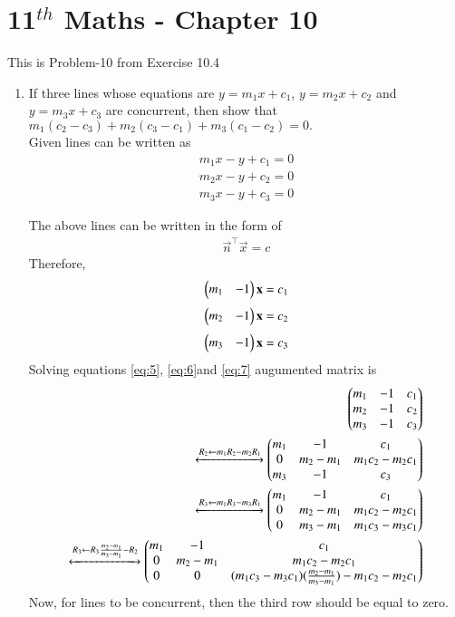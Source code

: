 \documentclass[12pt]{article}
\begin{document}
\section*{11$^{th}$ Maths - Chapter 10}
This is Problem-10 from Exercise 10.4
\begin{enumerate}
    \item If three lines whose equations are $y=m_1x+c_1$, $y=m_2x+c_2$ and $y=m_3x+c_3$ are concurrent, then show that $m_1(c_2-c_3)+m_2(c_3-c_1)+m_3(c_1-c_2) = 0.$\\
    \solution 
    Given lines can be written as \begin{align}
       m_1x-y+c_1=0
    \end{align}
    \begin{align}
        m_2x-y+c_2=0
    \end{align}
    \begin{align}
        m_3x-y+c_3=0
        \label{eq:3}
    \end{align}
    
    
   The above lines can be written in the form of \begin{align}
        \Vec{n}^{\top}\Vec{x} = c
    \end{align}
   Therefore,
		\begin{align}
       \begin{pmatrix}m_1&-1\end{pmatrix}\mathbf{x}=c_1
       \label{eq:5}
   \end{align} 
   \begin{align}
       \begin{pmatrix}m_2&-1\end{pmatrix}\mathbf{x}=c_2
       \label{eq:6}
   \end{align}
   \begin{align}
       \begin{pmatrix}m_3&-1\end{pmatrix}\mathbf{x}=c_3
       \label{eq:7}
   \end{align}
   Solving equations \eqref{eq:5}, \eqref{eq:6}and \eqref{eq:7}
		augumented matrix is
 \begin{align}
    \begin{pmatrix}m_1&-1&c_1\\m_2&-1&c_2\\m_3&-1&c_3\end{pmatrix}\\
    \xleftrightarrow{R_2 \leftarrow m_1R_2-m_2R_1}
    \begin{pmatrix}m_1&-1&c_1\\0&m_2-m_1&m_1c_2-m_2c_1\\m_3&-1&c_3\end{pmatrix}\\
    \xleftrightarrow{R_3 \leftarrow m_1R_3-m_3R_1}
    \begin{pmatrix}m_1&-1&c_1\\0&m_2-m_1&m_1c_2-m_2c_1\\0&m_3-m_1&m_1c_3-m_3c_1\end{pmatrix}\\
    \xleftrightarrow{R_3 \leftarrow R_3\frac{m_2-m_1}{m_3-m_1}-R_2}
    \begin{pmatrix}m_1&-1&c_1\\0&m_2-m_1&m_1c_2-m_2c_1\\0&0&(m_1c_3-m_3c_1)(\frac{m_2-m_1}{m_3-m_1})-m_1c_2-m_2c_1\end{pmatrix}
\end{align}
Now, for lines to be concurrent, then the third row should be equal to zero. \\


\end{enumerate}
\end{document}
